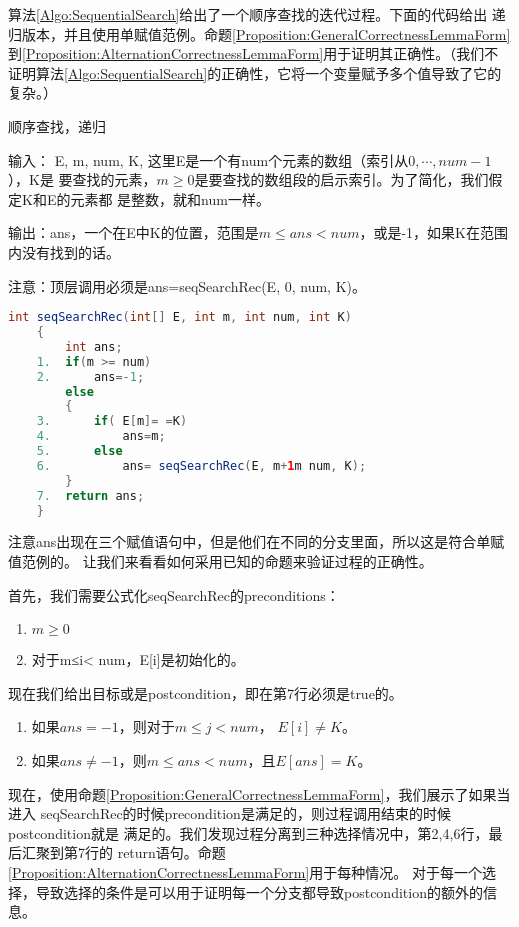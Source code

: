 \begin{example}\mbox{}\par
算法\ref{Algo:SequentialSearch}给出了一个顺序查找的迭代过程。下面的代码给出
递归版本，并且使用单赋值范例。命题\ref{Proposition:GeneralCorrectnessLemmaForm}
到\ref{Proposition:AlternationCorrectnessLemmaForm}用于证明其正确性。（我们不
证明算法\ref{Algo:SequentialSearch}的正确性，它将一个变量赋予多个值导致了它的复杂。）
\end{example}

\begin{algorithm}\label{Algo:seqSearchRec}
顺序查找，递归

输入： E, m, num, K, 这里E是一个有num个元素的数组（索引从$0, \cdots, num-1$），K是
要查找的元素，$m \geq 0$是要查找的数组段的启示索引。为了简化，我们假定K和E的元素都
是整数，就和num一样。

输出：ans，一个在E中K的位置，范围是$m \leq ans <num$，或是-1，如果K在范围内没有找到的话。

注意：顶层调用必须是ans=seqSearchRec(E, 0, num, K)。

\begin{lstlisting}[language={Java}, keywordstyle=\color{blue!70}, commentstyle=\color{red!50!green!50!blue!50}]
    int seqSearchRec(int[] E, int m, int num, int K)
    {
        int ans;
    1.  if(m >= num)
    2.      ans=-1;
        else
        {
    3.      if( E[m]= =K)
    4.          ans=m;
    5.      else
    6.          ans= seqSearchRec(E, m+1m num, K);
        }
    7.  return ans;
    }
\end{lstlisting}

注意ans出现在三个赋值语句中，但是他们在不同的分支里面，所以这是符合单赋值范例的。
让我们来看看如何采用已知的命题来验证过程的正确性。

首先，我们需要公式化seqSearchRec的preconditions：
\begin{enumerate}
\item $m\geq 0$
\item 对于m≤i< num，E[i]是初始化的。
\end{enumerate}
现在我们给出目标或是postcondition，即在第7行必须是true的。
\begin{enumerate}
\item 如果$ans=-1$，则对于$m \leq j < num$， $E[i]\neq K$。
\item 如果$ans \neq -1$，则$m \leq  ans< num$，且$E[ans]=K$。
\end{enumerate}
现在，使用命题\ref{Proposition:GeneralCorrectnessLemmaForm}，我们展示了如果当进入
seqSearchRec的时候precondition是满足的，则过程调用结束的时候postcondition就是
满足的。我们发现过程分离到三种选择情况中，第2,4,6行，最后汇聚到第7行的
return语句。命题\ref{Proposition:AlternationCorrectnessLemmaForm}用于每种情况。
对于每一个选择，导致选择的条件是可以用于证明每一个分支都导致postcondition的额外的信息。


\end{algorithm}
